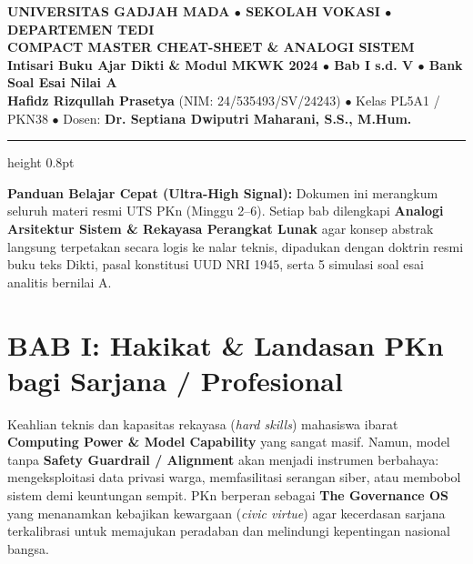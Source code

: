 \documentclass[10pt,a4paper]{article}
\begin{document}
\begin{center}
  {\large\bfseries\color{ugmblue}UNIVERSITAS GADJAH MADA $\bullet$ SEKOLAH VOKASI $\bullet$ DEPARTEMEN TEDI}\\[1mm]
  {\LARGE\bfseries\color{ugmblue}COMPACT MASTER CHEAT-SHEET \& ANALOGI SISTEM}\\[1mm]
  {\normalsize\bfseries\color{ugmgold}Intisari Buku Ajar Dikti \& Modul MKWK 2024 $\bullet$ Bab I s.d. V $\bullet$ Bank Soal Esai Nilai A}\\[1mm]
  {\footnotesize\color{textdark}\textbf{Hafidz Rizqullah Prasetya} (NIM: 24/535493/SV/24243) $\bullet$ Kelas PL5A1 / PKN38 $\bullet$ Dosen: \textbf{Dr. Septiana Dwiputri Maharani, S.S., M.Hum.}}
\end{center}
\vspace{-2mm}
\hrule height 0.8pt
\vspace{2mm}

\begin{tcolorbox}[colback=ugmblue!5, colframe=ugmblue, arc=1.5mm, boxrule=0.6pt, left=2.5mm, right=2.5mm, top=1.5mm, bottom=1.5mm]
\small
\textbf{Panduan Belajar Cepat (Ultra-High Signal):} Dokumen ini merangkum seluruh materi resmi UTS PKn (Minggu 2--6). Setiap bab dilengkapi \textbf{Analogi Arsitektur Sistem \& Rekayasa Perangkat Lunak} agar konsep abstrak langsung terpetakan secara logis ke nalar teknis, dipadukan dengan doktrin resmi buku teks Dikti, pasal konstitusi UUD NRI 1945, serta 5 simulasi soal esai analitis bernilai A.
\end{tcolorbox}

\section*{BAB I: Hakikat \& Landasan PKn bagi Sarjana / Profesional}

\begin{analogibox}
Keahlian teknis dan kapasitas rekayasa (\textit{hard skills}) mahasiswa ibarat \textbf{Computing Power \& Model Capability} yang sangat masif. Namun, model tanpa \textbf{Safety Guardrail / Alignment} akan menjadi instrumen berbahaya: mengeksploitasi data privasi warga, memfasilitasi serangan siber, atau membobol sistem demi keuntungan sempit. PKn berperan sebagai \textbf{The Governance OS} yang menanamkan kebajikan kewargaan (\textit{civic virtue}) agar kecerdasan sarjana terkalibrasi untuk memajukan peradaban dan melindungi kepentingan nasional bangsa.
\end{analogibox}
\end{document}
